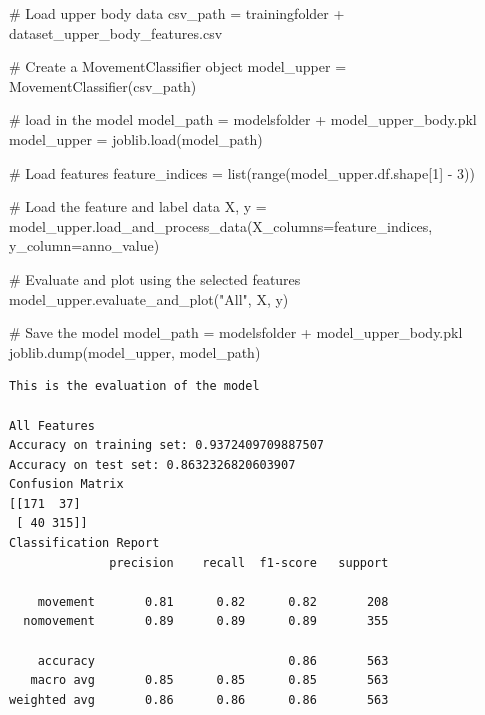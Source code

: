 \documentclass[
  letterpaper,
  DIV=11,
  numbers=noendperiod]{scrreprt}
\newenvironment{Shaded}{\begin{snugshade}}{\end{snugshade}}
\newcommand{\BuiltInTok}[1]{\textcolor[rgb]{0.00,0.23,0.31}{#1}}
\newcommand{\CommentTok}[1]{\textcolor[rgb]{0.37,0.37,0.37}{#1}}
\newcommand{\DecValTok}[1]{\textcolor[rgb]{0.68,0.00,0.00}{#1}}
\newcommand{\NormalTok}[1]{\textcolor[rgb]{0.00,0.23,0.31}{#1}}
\newcommand{\OperatorTok}[1]{\textcolor[rgb]{0.37,0.37,0.37}{#1}}
\newcommand{\StringTok}[1]{\textcolor[rgb]{0.13,0.47,0.30}{#1}}
\begin{document}
\begin{Shaded}
\begin{Highlighting}[]
\CommentTok{\# Load upper body data}
\NormalTok{csv\_path }\OperatorTok{=}\NormalTok{ trainingfolder }\OperatorTok{+} \StringTok{\textquotesingle{}dataset\_upper\_body\_features.csv\textquotesingle{}}

\CommentTok{\# Create a MovementClassifier object}
\NormalTok{model\_upper }\OperatorTok{=}\NormalTok{ MovementClassifier(csv\_path)}

\CommentTok{\# load in the model}
\NormalTok{model\_path }\OperatorTok{=}\NormalTok{ modelsfolder }\OperatorTok{+} \StringTok{\textquotesingle{}model\_upper\_body.pkl\textquotesingle{}}
\NormalTok{model\_upper }\OperatorTok{=}\NormalTok{ joblib.load(model\_path)}

\CommentTok{\# Load features}
\NormalTok{feature\_indices }\OperatorTok{=} \BuiltInTok{list}\NormalTok{(}\BuiltInTok{range}\NormalTok{(model\_upper.df.shape[}\DecValTok{1}\NormalTok{] }\OperatorTok{{-}} \DecValTok{3}\NormalTok{))}

\CommentTok{\# Load the feature and label data}
\NormalTok{X, y }\OperatorTok{=}\NormalTok{ model\_upper.load\_and\_process\_data(X\_columns}\OperatorTok{=}\NormalTok{feature\_indices, y\_column}\OperatorTok{=}\StringTok{\textquotesingle{}anno\_value\textquotesingle{}}\NormalTok{)}

\CommentTok{\# Evaluate and plot using the selected features}
\NormalTok{model\_upper.evaluate\_and\_plot(}\StringTok{"All"}\NormalTok{, X, y)}

\CommentTok{\# Save the model}
\NormalTok{model\_path }\OperatorTok{=}\NormalTok{ modelsfolder }\OperatorTok{+} \StringTok{\textquotesingle{}model\_upper\_body.pkl\textquotesingle{}}
\NormalTok{joblib.dump(model\_upper, model\_path)}
\end{Highlighting}
\end{Shaded}

\begin{verbatim}
This is the evaluation of the model

All Features
Accuracy on training set: 0.9372409709887507
Accuracy on test set: 0.8632326820603907
Confusion Matrix
[[171  37]
 [ 40 315]]
Classification Report
              precision    recall  f1-score   support

    movement       0.81      0.82      0.82       208
  nomovement       0.89      0.89      0.89       355

    accuracy                           0.86       563
   macro avg       0.85      0.85      0.85       563
weighted avg       0.86      0.86      0.86       563
\end{verbatim}
\end{document}
